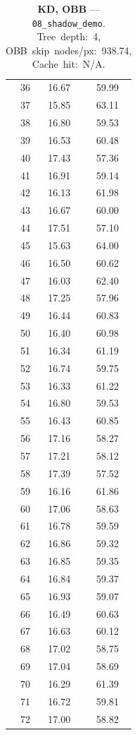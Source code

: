 \begin{table}[htbp]
\begin{tabular}{@{}rcc@{}}
    36 & 16.67 & 59.99 \\
    37 & 15.85 & 63.11 \\
    38 & 16.80 & 59.53 \\
    39 & 16.53 & 60.48 \\
    40 & 17.43 & 57.36 \\
    41 & 16.91 & 59.14 \\
    42 & 16.13 & 61.98 \\
    43 & 16.67 & 60.00 \\
    44 & 17.51 & 57.10 \\
    45 & 15.63 & 64.00 \\
    46 & 16.50 & 60.62 \\
    47 & 16.03 & 62.40 \\
    48 & 17.25 & 57.96 \\
    49 & 16.44 & 60.83 \\
    50 & 16.40 & 60.98 \\
    51 & 16.34 & 61.19 \\
    52 & 16.74 & 59.75 \\
    53 & 16.33 & 61.22 \\
    54 & 16.80 & 59.53 \\
    55 & 16.43 & 60.85 \\
    56 & 17.16 & 58.27 \\
    57 & 17.21 & 58.12 \\
    58 & 17.39 & 57.52 \\
    59 & 16.16 & 61.86 \\
    60 & 17.06 & 58.63 \\
    61 & 16.78 & 59.59 \\
    62 & 16.86 & 59.32 \\
    63 & 16.85 & 59.35 \\
    64 & 16.84 & 59.37 \\
    65 & 16.93 & 59.07 \\
    66 & 16.49 & 60.63 \\
    67 & 16.63 & 60.12 \\
    68 & 17.02 & 58.75 \\
    69 & 17.04 & 58.69 \\
    70 & 16.29 & 61.39 \\
    71 & 16.72 & 59.81 \\
    72 & 17.00 & 58.82 \\
    \bottomrule
  \end{tabular}
  \caption{\textbf{KD, OBB} --- \texttt{08\_shadow\_demo}. Tree~depth:~4, OBB~skip~nodes/px:~938.74, Cache~hit:~N/A.}
  \label{tab:rt-08-shadow-demo-KD-OBB}
\end{table}

